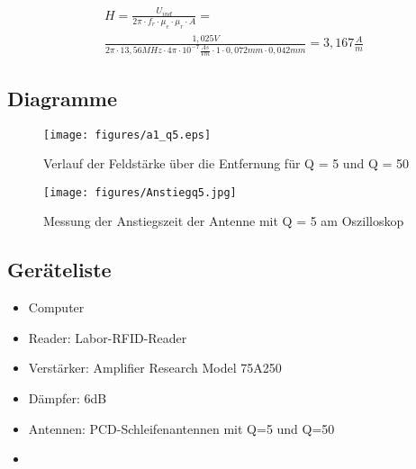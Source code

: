 \documentclass[12pt,a4paper,ngerman]{article}
\begin{document}
\begin{gather}
H = \frac{U_{ind}}{2\pi \cdot f_r \cdot \mu_e \cdot \mu_r \cdot A} = \\
\frac{1,025V}{2\pi \cdot 13,56MHz \cdot 4\pi \cdot 10^{-7}\frac{As}{Vm} \cdot 1 \cdot 0,072mm \cdot 0,042mm} = 3,167\frac{A}{m}
\end{gather}

\subsection{Diagramme}
\begin{figure}[H]
\centering
\texttt{[image: figures/a1\_q5.eps]} 
\caption{Verlauf der Feldstärke über die Entfernung für Q = 5 und Q = 50}
\label{fig:1_q5}
\end{figure}

\begin{figure}[H]
\centering
\texttt{[image: figures/Anstiegq5.jpg]} 
\caption{Messung der Anstiegszeit der Antenne mit Q = 5 am Oszilloskop}
\label{fig:1_anstieg}
\end{figure}

\subsection{Geräteliste}
\begin{itemize}
\item Computer
\item Reader: Labor-RFID-Reader
\item Verstärker: Amplifier Research Model 75A250
\item Dämpfer: 6dB
\item Antennen: PCD-Schleifenantennen mit Q=5 und Q=50
\item 
\end{itemize}
\pagebreak
\end{document}
